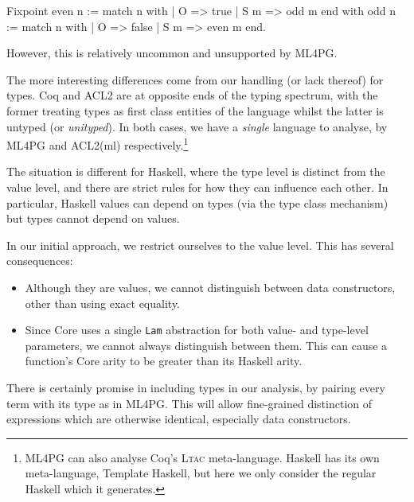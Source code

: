 \begin{coqblock}
Fixpoint even n := match n with
                       | O   => true
                       | S m => odd m
                   end
    with odd  n := match n with
                       | O   => false
                       | S m => even m
                   end.
\end{coqblock}

However, this is relatively uncommon and unsupported by ML4PG.

The more interesting differences come from our handling (or lack thereof) for types. Coq and ACL2 are at opposite ends of the typing spectrum, with the former treating types as first class entities of the language whilst the latter is untyped (or \emph{unityped}). In both cases, we have a \emph{single} language to analyse, by ML4PG and ACL2(ml) respectively.\footnote{ML4PG can also analyse Coq's \textsc{Ltac} meta-language. Haskell has its own meta-language, Template Haskell, but here we only consider the regular Haskell which it generates.}

The situation is different for Haskell, where the type level is distinct from the value level, and there are strict rules for how they can influence each other. In particular, Haskell values can depend on types (via the type class mechanism) but types cannot depend on values.

In our initial approach, we restrict ourselves to the value level. This has several consequences:

\begin{itemize}
  \item Although they are values, we cannot distinguish between data constructors, other than using exact equality.
  \item Since Core uses a single \texttt{Lam} abstraction for both value- and type-level parameters, we cannot always distinguish between them. This can cause a function's Core arity to be greater than its Haskell arity.
\end{itemize}

There is certainly promise in including types in our analysis, by pairing every term with its type as in ML4PG. This will allow fine-grained distinction of expressions which are otherwise identical, especially data constructors.
